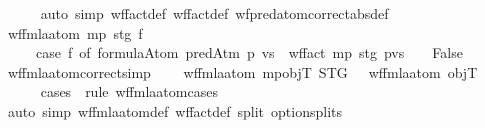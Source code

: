 \begin{isabellebody}
%
\isadelimproof
\ \ \ \ %
\endisadelimproof
%
\isatagproof
{}\isamarkupfalse%
\ {\isacharparenleft}{\kern0pt}auto\ simp{\isacharcolon}{\kern0pt}\ wf{\isacharunderscore}{\kern0pt}fact{\isacharprime}{\kern0pt}{\isacharunderscore}{\kern0pt}def\ wf{\isacharunderscore}{\kern0pt}fact{\isacharunderscore}{\kern0pt}def\ wf{\isacharunderscore}{\kern0pt}pred{\isacharunderscore}{\kern0pt}atom{\isacharprime}{\kern0pt}{\isacharunderscore}{\kern0pt}correct{\isacharbrackleft}{\kern0pt}abs{\isacharunderscore}{\kern0pt}def{\isacharbrackright}{\kern0pt}{\isacharparenright}{\kern0pt}%
\endisatagproof
{\isafoldproof}%
%
\isadelimproof
\isanewline
%
\endisadelimproof
\isanewline
\isanewline
\ \ \isamarkupfalse%
\ {\isachardoublequoteopen}wf{\isacharunderscore}{\kern0pt}fmla{\isacharunderscore}{\kern0pt}atom{}{\isacharprime}{\kern0pt}\ mp\ stg\ f\isanewline
\ \ \ \ {\isacharequal}{\kern0pt}\ {\isacharparenleft}{\kern0pt}case\ f\ of\ formula{\isachardot}{\kern0pt}Atom\ {\isacharparenleft}{\kern0pt}predAtm\ p\ vs{\isacharparenright}{\kern0pt}\ {\isasymRightarrow}\ {\isacharparenleft}{\kern0pt}wf{\isacharunderscore}{\kern0pt}fact{\isacharprime}{\kern0pt}\ mp\ stg\ {\isacharparenleft}{\kern0pt}p{\isacharcomma}{\kern0pt}vs{\isacharparenright}{\kern0pt}{\isacharparenright}{\kern0pt}\ {\isacharbar}{\kern0pt}\ {\isacharunderscore}{\kern0pt}\ {\isasymRightarrow}\ False{\isacharparenright}{\kern0pt}{\isachardoublequoteclose}\isanewline
\isanewline
\ \ \isamarkupfalse%
\ wf{\isacharunderscore}{\kern0pt}fmla{\isacharunderscore}{\kern0pt}atom{}{\isacharprime}{\kern0pt}{\isacharunderscore}{\kern0pt}correct{\isacharbrackleft}{\kern0pt}simp{\isacharbrackright}{\kern0pt}{\isacharcolon}{\kern0pt}\isanewline
\ \ \ \ {\isachardoublequoteopen}wf{\isacharunderscore}{\kern0pt}fmla{\isacharunderscore}{\kern0pt}atom{}{\isacharprime}{\kern0pt}\ mp{\isacharunderscore}{\kern0pt}objT\ STG\ {\isasymphi}\ {\isacharequal}{\kern0pt}\ wf{\isacharunderscore}{\kern0pt}fmla{\isacharunderscore}{\kern0pt}atom\ objT\ {\isasymphi}{\isachardoublequoteclose}\isanewline
%
\isadelimproof
\ \ \ \ %
\endisadelimproof
%
\isatagproof
{}\isamarkupfalse%
\ {\isacharparenleft}{\kern0pt}cases\ {\isasymphi}\ rule{\isacharcolon}{\kern0pt}\ wf{\isacharunderscore}{\kern0pt}fmla{\isacharunderscore}{\kern0pt}atom{\isachardot}{\kern0pt}cases{\isacharparenright}{\kern0pt}\isanewline
\ \ \ \ \isamarkupfalse%
\ {\isacharparenleft}{\kern0pt}auto\ simp{\isacharcolon}{\kern0pt}\ wf{\isacharunderscore}{\kern0pt}fmla{\isacharunderscore}{\kern0pt}atom{}{\isacharprime}{\kern0pt}{\isacharunderscore}{\kern0pt}def\ wf{\isacharunderscore}{\kern0pt}fact{\isacharunderscore}{\kern0pt}def\ split{\isacharcolon}{\kern0pt}\ option{\isachardot}{\kern0pt}splits{\isacharparenright}{\kern0pt}%

\end{isabellebody}
